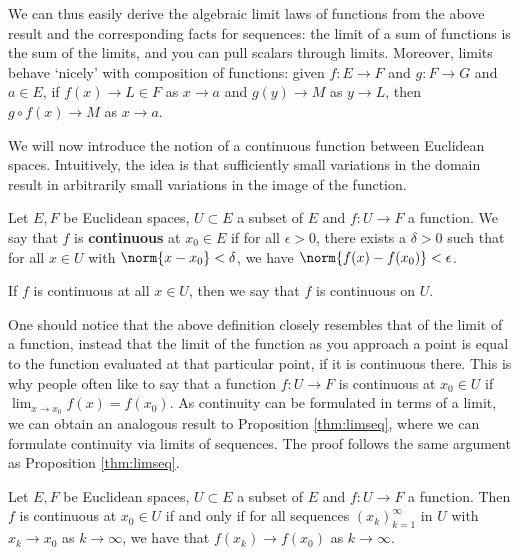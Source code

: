  We can thus easily derive the algebraic limit laws of functions from the above result and the corresponding facts for sequences: the limit of a sum of functions is the sum of the limits, and you can pull scalars through limits. Moreover, limits behave `nicely' with composition of functions: given \( f:E\to F \) and \( g:F\to G \) and \( a\in E \), if \( f(x)\to L\in F \) as \( x\to a \) and \( g(y)\to M \) as \( y\to L \), then \( g\circ f(x)\to M \) as \( x\to a \).

 \vspace{3mm}

 We will now introduce the notion of a continuous function between Euclidean spaces. Intuitively, the idea is that sufficiently small variations in the domain result in arbitrarily small variations in the image of the function.

 \begin{definition}
   Let \( E, F \) be Euclidean spaces, \( U\subset E \) a subset of \( E \) and \( f:U\to F \) a function. We say that \( f \) is \textbf{continuous} at \( x_0\in E \) if for all \( \epsilon>0 \), there exists a \( \delta>0 \) such that for all \( x\in U \) with \( \norm{x-x_0}<\delta \), we have \( \norm{f(x)-f(x_0)}<\epsilon \).

   \vspace{3mm}

   If \( f \) is continuous at all \( x\in U \), then we say that \( f \) is continuous on \( U \).
 \end{definition}

 One should notice that the above definition closely resembles that of the limit of a function, instead that the limit of the function as you approach a point is equal to the function evaluated at that particular point, if it is continuous there. This is why people often like to say that a function \( f:U\to F \) is continuous at \( x_0\in U \) if \( \lim_{x\to x_0}f(x)=f(x_0) \). As continuity can be formulated in terms of a limit, we can obtain an analogous result to Proposition \ref{thm:limseq}, where we can formulate continuity via limits of sequences. The proof follows the same argument as Proposition \ref{thm:limseq}.

 \begin{proposition}
   \label{thm:seqcont}
   Let \( E, F \) be Euclidean spaces, \( U\subset E \) a subset of \( E \) and \( f:U\to F \) a function. Then \( f \) is continuous at \( x_0\in U \) if and only if for all sequences \( (x_k)_{k=1}^\infty \) in \( U \) with \( x_k\to x_0 \) as \( k\to\infty \), we have that \( f(x_k)\to f(x_0) \) as \( k\to\infty \).
 \end{proposition}

